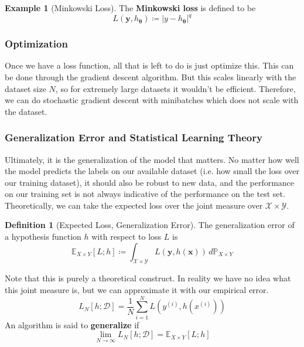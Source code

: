 \documentclass{article}
\theoremstyle{definition}
\newtheorem{example}{Example}[section]
\theoremstyle{remark}
\theoremstyle{definition}
\newtheorem{definition}{Definition}[section]
\begin{document}
\begin{example}[Minkowski Loss]
The \textbf{Minkowski loss} is defined to be 
\[L(\mathbf{y}, h_{\boldsymbol{\theta}}) \coloneqq | y - h_{\boldsymbol{\theta}} |^q\]
\end{example}

\subsubsection{Optimization}

Once we have a loss function, all that is left to do is just optimize this. This can be done through the gradient descent algorithm. But this scales linearly with the dataset size $N$, so for extremely large datasets it wouldn't be efficient. Therefore, we can do stochastic gradient descent with minibatches which does not scale with the dataset. 

\subsubsection{Generalization Error and Statistical Learning Theory}

Ultimately, it is the generalization of the model that matters. No matter how well the model predicts the labels on our available dataset (i.e. how small the loss over our training dataset), it should also be robust to new data, and the performance on our training set is not always indicative of the performance on the test set. Theoretically, we can take the expected loss over the joint measure over $\mathcal{X} \times \mathcal{Y}$. 

\begin{definition}[Expected Loss, Generalization Error]
The generalization error of a hypothesis function $h$ with respect to loss $L$ is 
\[\mathbb{E}_{X \times Y}[L; h] \coloneqq \int_{\mathcal{X} \times \mathcal{Y}} L(\mathbf{y}, h(\mathbf{x})) \, d\mathbb{P}_{X \times Y}\]
\end{definition}
Note that this is purely a theoretical construct. In reality we have no idea what this joint measure is, but we can approximate it with our empirical error. 
\[L_N [h; \mathcal{D}] = \frac{1}{N} \sum_{i=1}^N L(y^{(i)}, h(x^{(i)}) )\]
An algorithm is said to \textbf{generalize} if 
\[\lim_{N \rightarrow \infty} L_N [h; \mathcal{D}] = \mathbb{E}_{X \times Y}[L; h]\]
\end{document}
